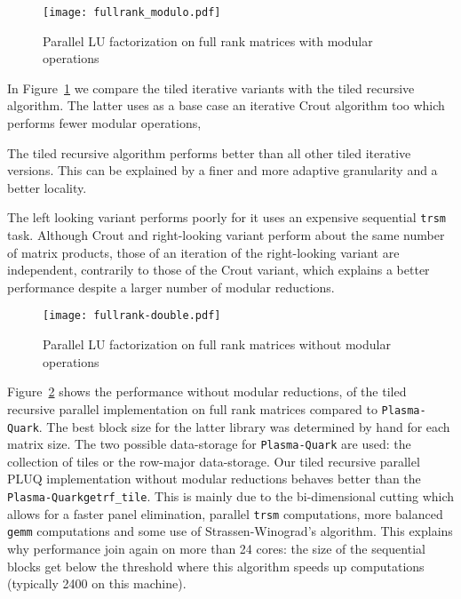 \documentclass{article}
\newcommand{\gemm}{\texttt{gemm}\xspace}
\newcommand{\trsm}{\texttt{trsm}\xspace}
\newcommand{\dgetrftile}{\texttt{getrf\_tile}\xspace}
\newcommand{\plasmaquark}{\texttt{Plasma-Quark}\xspace}
\begin{document}
 
 
 
 
 
 
 
 
 
 
 
 
 
 
 
 

\begin{figure}[ht!]
\centering
\texttt{[image: fullrank\_modulo.pdf]}
\caption{Parallel LU factorization on full rank matrices with modular operations}
\label{fig:moduloBlockLU}
\end{figure}
In Figure~\ref{fig:moduloBlockLU} we compare the tiled iterative variants with
the tiled recursive algorithm. The latter uses as a base case an iterative Crout
algorithm too which performs fewer modular operations,
 
 
The tiled recursive algorithm performs better than all other tiled iterative
versions.
This can be explained by a finer and more adaptive  granularity and a better locality.
 
The left looking variant performs poorly for it uses an expensive sequential
\trsm task. Although Crout and right-looking variant perform about the same
number of matrix products, those of an iteration of the right-looking variant
are independent, contrarily to those of the Crout variant, which explains a
better performance despite a larger number of modular reductions.

  
 
 
 
 
 
 
 
 
 
 
 
 
 

\begin{figure}[ht!]
\centering
\texttt{[image: fullrank-double.pdf]}
\caption{Parallel LU factorization on full rank matrices without modular operations}
\label{fig:doubleBlockLU}
\end{figure}
Figure~\ref{fig:doubleBlockLU} shows the performance without modular
reductions, of the tiled recursive parallel implementation on full rank matrices
compared to \plasmaquark. 
The best block size for the latter library was
determined by hand for each matrix size. The two possible data-storage for
\plasmaquark are used: the collection of tiles or the row-major data-storage.
Our tiled recursive parallel PLUQ implementation without modular reductions
behaves better than the \plasmaquark \dgetrftile. This is mainly due
to the bi-dimensional cutting which allows for a faster panel elimination,  parallel \trsm
computations, more balanced \gemm computations and some use of
Strassen-Winograd's algorithm. This explains why performance join again on more
than 24 cores: the size of the sequential blocks get below the threshold where
this algorithm speeds up computations (typically 2400 on this machine).
 
\end{document}
